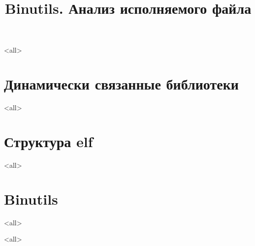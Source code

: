 
\title[binutils]{Binutils. Анализ исполняемого файла}





\begin{frame}
	\frametitle{}
	\titlepage
	\vspace{-0.5cm}
	\begin{center}
	\end{center}
\end{frame}

\begin{frame}
	\tableofcontents
\end{frame}



\mode<all>{}

\section{Динамически связанные библиотеки}
\mode<all>{}

\section{Структура elf}
\mode<all>{}

\section{Binutils}
\mode<all>{}

\mode<all>

